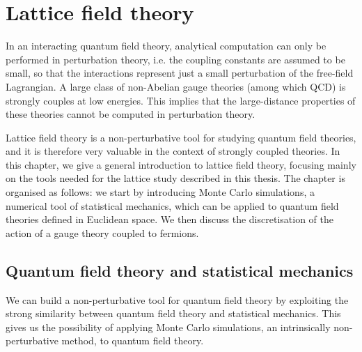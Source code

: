 \chapter{Lattice field theory}

In an interacting quantum field theory, analytical computation can only be performed in perturbation theory, i.e. the coupling constants are assumed to be small, so that the interactions represent just a small perturbation of the free-field Lagrangian. A large class of non-Abelian gauge theories (among which QCD) is strongly couples at low energies. This implies that the large-distance properties of these theories cannot be computed in perturbation theory. 

Lattice field theory is a non-perturbative tool for studying quantum field theories, and it is therefore very valuable in the context of strongly coupled theories. In this chapter, we give a general introduction to lattice field theory, focusing mainly on the tools needed for the lattice study described in this thesis. The chapter is organised as follows: we start by introducing Monte Carlo simulations, a numerical tool of statistical mechanics, which can be applied to quantum field theories defined in Euclidean space. 
We then discuss the discretisation of the action of a gauge theory coupled to fermions. 



\section{Quantum field theory and statistical mechanics}
\label{QFT-SM}

We can build a non-perturbative tool for quantum field theory by exploiting the strong similarity between quantum field theory and statistical mechanics. This gives us the possibility of applying Monte Carlo simulations, an intrinsically non-perturbative method, to quantum field theory.

